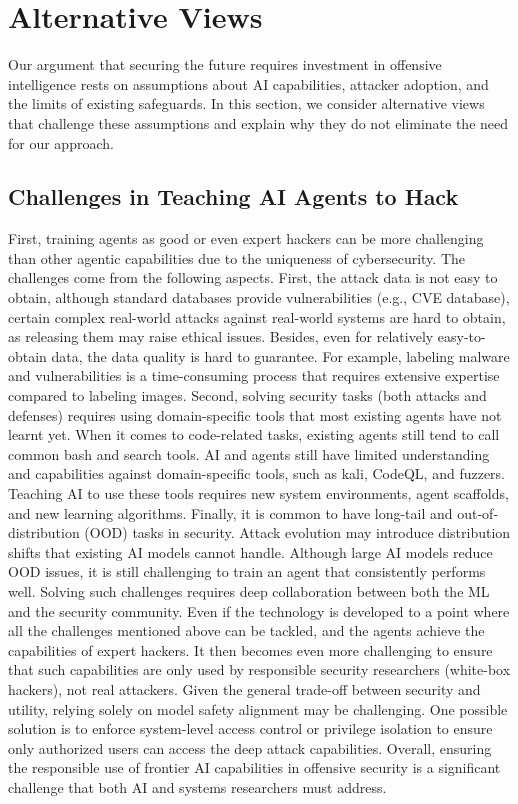 \documentclass{article}
\theoremstyle{plain}
\theoremstyle{definition}
\theoremstyle{remark}
\begin{document}
\section{Alternative Views}
\label{sec:5}



Our argument that securing the future requires investment in offensive intelligence rests on assumptions about AI capabilities, attacker adoption, and the limits of existing safeguards. 
In this section, we consider alternative views that challenge these assumptions and explain why they do not eliminate the need for our approach.



\subsection{Challenges in Teaching AI Agents to Hack}

First, training agents as good or even expert hackers can be more challenging than other agentic capabilities due to the uniqueness of cybersecurity.
The challenges come from the following aspects.
First, the attack data is not easy to obtain, although standard databases provide vulnerabilities (e.g., CVE database), certain complex real-world attacks against real-world systems are hard to obtain, as releasing them may raise ethical issues. 
Besides, even for relatively easy-to-obtain data, the data quality is hard to guarantee.
For example, labeling malware and vulnerabilities is a time-consuming process that requires extensive expertise compared to labeling images. 
Second, solving security tasks (both attacks and defenses) requires using domain-specific tools that most existing agents have not learnt yet.
When it comes to code-related tasks, existing agents still tend to call common bash and search tools.
AI and agents still have limited understanding and capabilities against domain-specific tools, such as kali, CodeQL, and fuzzers.
Teaching AI to use these tools requires new system environments, agent scaffolds, and new learning algorithms.
Finally, it is common to have long-tail and out-of-distribution (OOD) tasks in security.
Attack evolution may introduce distribution shifts that existing AI models cannot handle.
Although large AI models reduce OOD issues, it is still challenging to train an agent that consistently performs well. Solving such challenges requires deep collaboration between both the ML and the security community. 
Even if the technology is developed to a point where all the challenges mentioned above can be tackled, and the agents achieve the capabilities of expert hackers.
It then becomes even more challenging to ensure that such capabilities are only used by responsible security researchers (white-box hackers), not real attackers.
Given the general trade-off between security and utility, relying solely on model safety alignment may be challenging.
One possible solution is to enforce system-level access control or privilege isolation to ensure only authorized users can access the deep attack capabilities. 
Overall, ensuring the responsible use of frontier AI capabilities in offensive security is a significant challenge that both AI and systems researchers must address.
\end{document}
